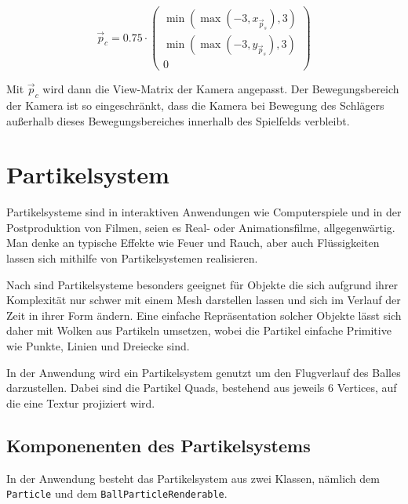 \begin{equation}
	\label{camPos}
	\vec{p}_c = 0.75 \cdot 
	\begin{pmatrix}
		\min(\max(-3,x_{\vec{p}_s}),3)\\
		\min(\max(-3,y_{\vec{p}_s}),3)\\
		0
	\end{pmatrix}
\end{equation}

Mit $\vec{p}_c$ wird dann die View-Matrix der Kamera angepasst. Der Bewegungsbereich der Kamera ist so eingeschränkt, dass die Kamera bei Bewegung des Schlägers außerhalb dieses Bewegungsbereiches innerhalb des Spielfelds verbleibt.
\section{Partikelsystem}
\label{Kapitel_2_-_Unterkapitel_2}
%
Partikelsysteme sind in interaktiven Anwendungen wie Computerspiele und in der Postproduktion von Filmen, seien es Real- oder Animationsfilme, allgegenwärtig.
Man denke an typische Effekte wie Feuer und Rauch, aber auch Flüssigkeiten lassen sich mithilfe von Partikelsystemen realisieren.

Nach \cite{reeves:particle_systems} sind Partikelsysteme besonders geeignet für Objekte die sich aufgrund ihrer Komplexität nur schwer mit einem Mesh darstellen lassen und sich im Verlauf der Zeit in ihrer Form ändern. Eine einfache Repräsentation solcher Objekte lässt sich daher mit Wolken aus Partikeln umsetzen, wobei die Partikel einfache Primitive wie Punkte, Linien und Dreiecke sind.

In der Anwendung wird ein Partikelsystem genutzt um den Flugverlauf des Balles darzustellen. Dabei sind die Partikel Quads, bestehend aus jeweils 6 Vertices, auf die eine Textur projiziert wird.

\subsection{Komponenenten des Partikelsystems}
\label{Kapitel_2_-_Unterkapitel_2.1}
%
In der Anwendung besteht das Partikelsystem aus zwei Klassen, nämlich dem {\texttt{Particle}} und dem {\texttt{BallParticleRenderable}}.

